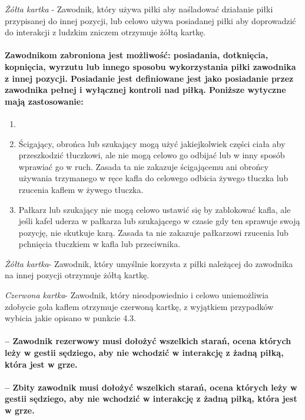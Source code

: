 \documentclass[12pt]{article}
\begin{document}
\emph{Żółta kartka} - Zawodnik, który używa piłki aby naśladować
działanie piłki przypisanej do innej pozycji, lub celowo używa
posiadanej piłki aby doprowadzić do interakcji z ludzkim zniczem
otrzymuje żółtą kartkę.

\paragraph{Zawodnikom zabroniona jest możliwość: posiadania,
	dotknięcia, kopnięcia, wyrzutu lub innego sposobu wykorzystania piłki
	zawodnika z innej pozycji. Posiadanie jest definiowane jest jako
	posiadanie przez zawodnika pełnej i wyłącznej kontroli nad piłką.
	Poniższe wytyczne mają zastosowanie:}

\begin{enumerate}
	\item
	\item Ścigający, obrońca lub szukający mogą użyć jakiejkolwiek części
	      ciała aby przeszkodzić tłuczkowi, ale nie mogą celowo go odbijać lub w
	      inny sposób wprawiać go w ruch. Zasada ta nie zakazuje ścigającemu ani
	      obrońcy używania trzymanego w ręce kafla do celowego odbicia żywego
	      tłuczka lub rzucenia kaflem w żywego tłuczka.
	\item
	      Pałkarz lub szukający nie mogą celowo ustawić się by zablokować kafla,
	      ale jeśli kafel uderza w pałkarza lub szukającego w czasie gdy ten
	      sprawuje swoją pozycję, nie skutkuje karą. Zasada ta nie zakazuje
	      pałkarzowi rzucenia lub pchnięcia tłuczkiem w kafla lub przeciwnika.
\end{enumerate}

\emph{Żółta kartka}- Zawodnik, który umyślnie korzysta z piłki należącej
do zawodnika na innej pozycji otrzymuje żółtą kartkę.

\emph{Czerwona kartka}- Zawodnik, który nieodpowiednio i celowo
uniemożliwia zdobycie gola kaflem otrzymuje czerwoną kartkę, z wyjątkiem
przypadków wybicia jakie opisano w punkcie 4.3.

\paragraph{-- Zawodnik rezerwowy musi dołożyć wszelkich starań,
	ocena których leży w gestii sędziego, aby nie wchodzić w interakcję z
	żadną piłką, która jest w grze.}

\paragraph{-- Zbity zawodnik musi dołożyć wszelkich starań, ocena
	których leży w gestii sędziego, aby nie wchodzić w interakcję z żadną
	piłką, która jest w grze.}
\end{document}

